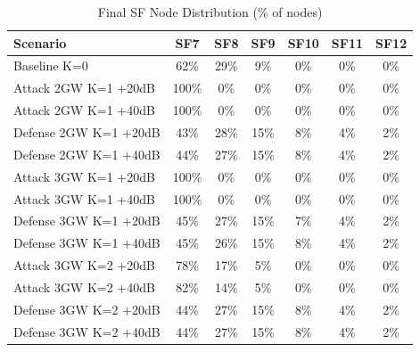 \begin{table}[t]
\centering
\caption{Final SF Node Distribution (\% of nodes)}
\label{tab:sf_dist}
\begin{tabular}{lcccccc}
\toprule
Scenario & SF7 & SF8 & SF9 & SF10 & SF11 & SF12 \\
\midrule
Baseline K=0 & 62\% & 29\% & 9\% & 0\% & 0\% & 0\% \\
Attack 2GW K=1 +20dB & 100\% & 0\% & 0\% & 0\% & 0\% & 0\% \\
Attack 2GW K=1 +40dB & 100\% & 0\% & 0\% & 0\% & 0\% & 0\% \\
Defense 2GW K=1 +20dB & 43\% & 28\% & 15\% & 8\% & 4\% & 2\% \\
Defense 2GW K=1 +40dB & 44\% & 27\% & 15\% & 8\% & 4\% & 2\% \\
Attack 3GW K=1 +20dB & 100\% & 0\% & 0\% & 0\% & 0\% & 0\% \\
Attack 3GW K=1 +40dB & 100\% & 0\% & 0\% & 0\% & 0\% & 0\% \\
Defense 3GW K=1 +20dB & 45\% & 27\% & 15\% & 7\% & 4\% & 2\% \\
Defense 3GW K=1 +40dB & 45\% & 26\% & 15\% & 8\% & 4\% & 2\% \\
Attack 3GW K=2 +20dB & 78\% & 17\% & 5\% & 0\% & 0\% & 0\% \\
Attack 3GW K=2 +40dB & 82\% & 14\% & 5\% & 0\% & 0\% & 0\% \\
Defense 3GW K=2 +20dB & 44\% & 27\% & 15\% & 8\% & 4\% & 2\% \\
Defense 3GW K=2 +40dB & 44\% & 27\% & 15\% & 8\% & 4\% & 2\% \\
\bottomrule
\end{tabular}
\end{table}
